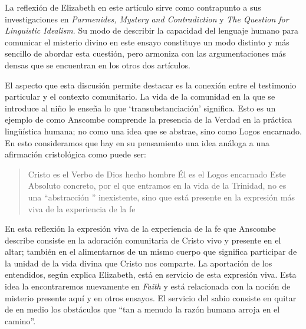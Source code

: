 \vspace{2.83334em}
\vspace{1.41667em}
La reflexión de Elizabeth en este artículo sirve como contrapunto a sus investigaciones en \emph{Parmenides, Mystery and Contradiction} y \emph{The Question for Linguistic Idealism}. Su modo de describir la capacidad del lenguaje humano para comunicar el misterio divino en este ensayo constituye un modo distinto y más sencillo de abordar esta cuestión, pero armoniza con las argumentaciones más densas que se encuentran en los otros dos artículos.

El aspecto que esta discusión permite destacar es la conexión entre el testimonio particular y el contexto comunitario. La vida de la comunidad en la que se introduce al niño le enseña lo que `transubstanciación' significa. Esto es un ejemplo de como Anscombe comprende la presencia de la Verdad en la práctica lingüística humana; no como una idea que se abstrae, sino como Logos encarnado. En esto consideramos que hay en su pensamiento una idea análoga a una afirmación cristológica como puede ser: \blockquote[{\Cite[410-411]{dominguez2009at}}]{Cristo es el Verbo de Dios hecho hombre \textelp{} Él es el Logos encarnado \textelp{} Este Absoluto concreto, por el que entramos en la vida de la Trinidad, no es una ``abstracción '' inexistente, sino que está presente en la expresión más viva de la experiencia de la fe}.
En esta reflexión la expresión viva de la experiencia de la fe que Anscombe describe consiste en la adoración comunitaria de Cristo vivo y presente en el altar; también en el alimentarnos de un mismo cuerpo que significa participar de la unidad de la vida divina que Cristo nos comparte. La aportación de los entendidos, según explica Elizabeth, está en servicio de esta expresión viva. Esta idea la encontraremos nuevamente en \emph{Faith} y está relacionada con la noción de misterio presente aquí y en otros ensayos. El servicio del sabio consiste en quitar de en medio los obstáculos que \enquote{tan a menudo la razón humana arroja en el camino}.
